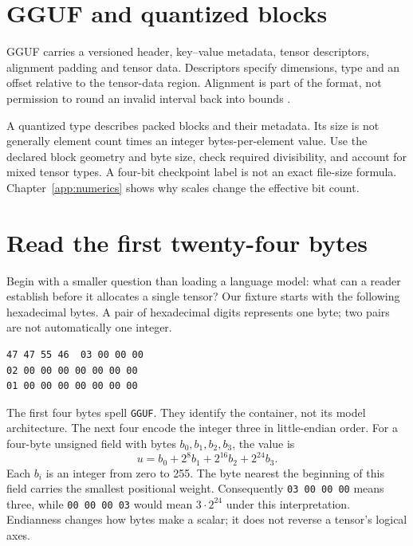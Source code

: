 
\section{GGUF and quantized blocks}
GGUF carries a versioned header, key--value metadata, tensor descriptors,
alignment padding and tensor data. Descriptors specify dimensions, type
and an offset relative to the tensor-data region. Alignment is part of
the format, not permission to round an invalid interval back into bounds
\cite{ggml2026gguf}.

A quantized type describes packed blocks and their metadata. Its size is
not generally element count times an integer bytes-per-element value.
Use the declared block geometry and byte size, check required divisibility,
and account for mixed tensor types. A four-bit checkpoint label is not
an exact file-size formula. Chapter~\ref{app:numerics} shows why scales
change the effective bit count.

\section{Read the first twenty-four bytes}
Begin with a smaller question than loading a language model: what can a
reader establish before it allocates a single tensor? Our fixture starts
with the following hexadecimal bytes. A pair of hexadecimal digits
represents one byte; two pairs are not automatically one integer.
\begin{verbatim}
47 47 55 46  03 00 00 00
02 00 00 00 00 00 00 00
01 00 00 00 00 00 00 00
\end{verbatim}
The first four bytes spell \texttt{GGUF}. They identify the container,
not its model architecture. The next four encode the integer three in
little-endian order. For a four-byte unsigned field with bytes
$b_0,b_1,b_2,b_3$, the value is
\begin{equation}
u=b_0+2^8b_1+2^{16}b_2+2^{24}b_3.
\end{equation}
Each $b_i$ is an integer from zero to 255. The byte nearest the beginning
of this field carries the smallest positional weight. Consequently
\texttt{03 00 00 00} means three, while \texttt{00 00 00 03} would
mean $3\cdot2^{24}$ under this interpretation. Endianness changes how
bytes make a scalar; it does not reverse a tensor's logical axes.

